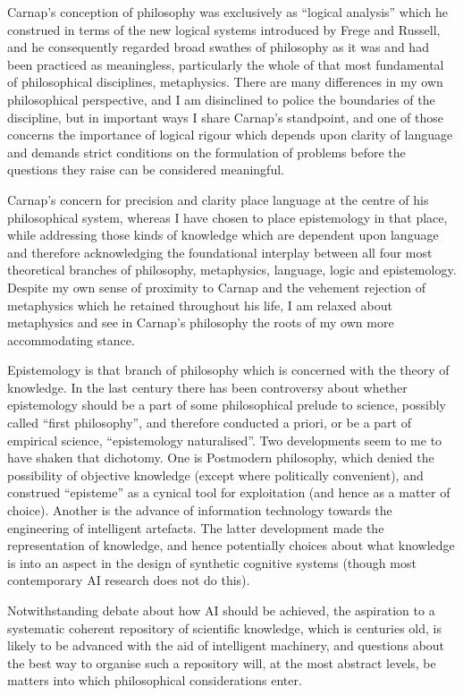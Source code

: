 \documentclass[10pt,titlepage]{book}
\begin{document}
Carnap’s conception of philosophy was exclusively as “logical analysis” which he construed in terms of the new logical systems introduced by Frege and Russell, and he consequently regarded broad swathes of philosophy as it was and had been practiced as meaningless, particularly the whole of that most fundamental of philosophical disciplines, metaphysics. There are many differences in my own philosophical perspective, and I am disinclined to police the boundaries of the discipline, but in important ways I share Carnap’s standpoint, and one of those concerns the importance of logical rigour which depends upon clarity of language and demands strict conditions on the formulation of problems before the questions they raise can be considered meaningful.

Carnap’s concern for precision and clarity place language at the centre of his philosophical system, whereas I have chosen to place epistemology in that place, while addressing those kinds of knowledge which are dependent upon language and therefore acknowledging the foundational interplay between all four most theoretical branches of philosophy, metaphysics, language, logic and epistemology. Despite my own sense of proximity to Carnap and the vehement rejection of metaphysics which he retained throughout his life, I am relaxed about metaphysics and see in Carnap’s philosophy the roots of my own more accommodating stance.

Epistemology is that branch of philosophy which is concerned with the theory of knowledge.
In the last century there has been controversy about whether epistemology should be a part of some philosophical prelude to science, possibly called “first philosophy”, and therefore conducted a priori, or be a part of empirical science, “epistemology naturalised”.   Two developments seem to me to have shaken that dichotomy.   One is Postmodern philosophy, which denied the possibility of objective knowledge (except where politically convenient), and construed “episteme” as a cynical tool for exploitation (and hence as a matter of choice).  Another is the advance of information technology towards the engineering of intelligent artefacts.  The latter development made the representation of knowledge, and hence potentially choices about what knowledge is into an aspect in the design of synthetic cognitive systems (though most contemporary AI research does not do this).

Notwithstanding debate about how AI should be achieved, the aspiration to a systematic coherent repository of scientific knowledge, which is centuries old, is likely to be advanced with the aid of intelligent machinery, and questions about the best way to organise such a repository will, at the most abstract levels, be matters into which philosophical considerations enter.
\end{document}
